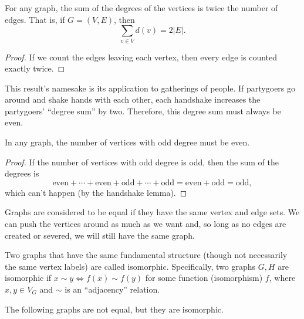 \documentclass[../m055main.tex]{subfiles}
\begin{document}
\begin{lemma}
    For any graph, the sum of the degrees of the vertices is twice the number of edges.
    That is, if $G = (V,E)$, then
    \[ \sum_{v \in V} d(v) = 2 |E|. \]
\end{lemma}

\begin{proof}
    If we count the edges leaving each vertex, then every edge is counted exactly twice. 
\end{proof}

This result's namesake is its application to gatherings of people.
If partygoers go around and shake hands with each other, each handshake increases the partygoers' ``degree sum'' by two.
Therefore, this degree sum must always be even.

\begin{corollary}[Oddballs]
    In any graph, the number of vertices with odd degree must be even.
\end{corollary}

\begin{proof}
    If the number of vertices with odd degree is odd, then the sum of the degrees is
    \[ \text{even} + \cdots + \text{even} + \text{odd} + \cdots + \text{odd} = \text{even} + \text{odd} = \text{odd}, \]
    which can't happen (by the handshake lemma).
\end{proof}

Graphs are considered to be equal if they have the same vertex and edge sets.
We can push the vertices around as much as we want and, so long as no edges are created or severed, we will still have the same graph.

Two graphs that have the same fundamental structure (though not necessarily the same vertex labels) are called isomorphic.
Specifically, two graphs $G,H$ are isomorphic if $x \sim y \iff f(x) \sim f(y)$ for some function (isomorphism) $f$, where $x,y \in V_G$ and $\sim$ is an ``adjacency'' relation.

The following graphs are not equal, but they are isomorphic.

\medskip
\begin{center}
\end{center}
\end{document}
